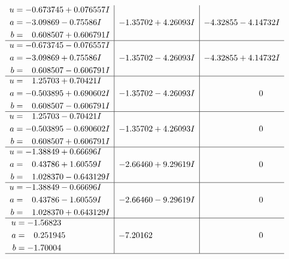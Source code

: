 \documentclass[1p]{elsarticle_modified}
\theoremstyle{definition}
\begin{document}
$$\begin{array}{c|c|c}
\begin{aligned}
u &= -0.673745 + 0.076557 I \\
a &= -3.09869 - 0.75586 I \\
b &= \phantom{-}0.608507 + 0.606791 I\end{aligned}
 & -1.35702 + 4.26093 I & -4.32855 - 4.14732 I \\ \hline\begin{aligned}
u &= -0.673745 - 0.076557 I \\
a &= -3.09869 + 0.75586 I \\
b &= \phantom{-}0.608507 - 0.606791 I\end{aligned}
 & -1.35702 - 4.26093 I & -4.32855 + 4.14732 I \\ \hline\begin{aligned}
u &= \phantom{-}1.25703 + 0.70421 I \\
a &= -0.503895 + 0.690602 I \\
b &= \phantom{-}0.608507 - 0.606791 I\end{aligned}
 & -1.35702 - 4.26093 I & \phantom{-0.000000 } 0 \\ \hline\begin{aligned}
u &= \phantom{-}1.25703 - 0.70421 I \\
a &= -0.503895 - 0.690602 I \\
b &= \phantom{-}0.608507 + 0.606791 I\end{aligned}
 & -1.35702 + 4.26093 I & \phantom{-0.000000 } 0 \\ \hline\begin{aligned}
u &= -1.38849 + 0.66696 I \\
a &= \phantom{-}0.43786 + 1.60559 I \\
b &= \phantom{-}1.028370 - 0.643129 I\end{aligned}
 & -2.66460 + 9.29619 I & \phantom{-0.000000 } 0 \\ \hline\begin{aligned}
u &= -1.38849 - 0.66696 I \\
a &= \phantom{-}0.43786 - 1.60559 I \\
b &= \phantom{-}1.028370 + 0.643129 I\end{aligned}
 & -2.66460 - 9.29619 I & \phantom{-0.000000 } 0 \\ \hline\begin{aligned}
u &= -1.56823\phantom{ +0.000000I} \\
a &= \phantom{-}0.251945\phantom{ +0.000000I} \\
b &= -1.70004\phantom{ +0.000000I}\end{aligned}
 & -7.20162\phantom{ +0.000000I} & \phantom{-0.000000 } 0\\
 \hline 
 \end{array}$$\newpage
\end{document}
